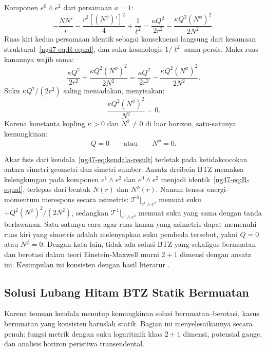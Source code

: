 \noindent Komponen $e^0 \wedge e^2$ dari persamaan $a = 1$:
\begin{equation}\label{ng47-eq:E1}
    -\frac{NN'}{r} - \frac{r^2[(N^\phi)']^2}{4} + \frac{1}{\ell^2}
    = \frac{\kappa Q^2}{2r^2} - \frac{\kappa Q^2(N^\phi)^2}{2N^2}.
\end{equation}
Ruas kiri kedua persamaan identik sebagai konsekuensi langsung dari kesamaan struktural~\eqref{ng47-eq:R-equal}, dan suku kosmologis $1/\ell^2$ sama persis. Maka ruas kanannya wajib sama:
\begin{equation}
    \frac{\kappa Q^2}{2r^2} + \frac{\kappa Q^2(N^\phi)^2}{2N^2}
    = \frac{\kappa Q^2}{2r^2} - \frac{\kappa Q^2(N^\phi)^2}{2N^2}.
\end{equation}
Suku $\kappa Q^2/(2r^2)$ saling meniadakan, menyisakan:
\begin{equation}
    \frac{\kappa Q^2(N^\phi)^2}{N^2} = 0.
\end{equation}
Karena konstanta kopling $\kappa > 0$ dan $N^2 \neq 0$ di luar horizon, satu-satunya kemungkinan:
\begin{equation}\label{ng47-eq:kendala-result}
    Q = 0 \qquad \text{atau} \qquad N^\phi = 0.
\end{equation}

Akar fisis dari kendala~\eqref{ng47-eq:kendala-result} terletak pada ketidakcocokan antara simetri geometri dan simetri sumber. Ansatz dreibein BTZ memaksa kelengkungan pada komponen $e^1 \wedge e^2$ dan $e^0 \wedge e^2$ menjadi identik~\eqref{ng47-eq:R-equal}, terlepas dari bentuk $N(r)$ dan $N^\phi(r)$. Namun tensor energi-momentum merespons secara asimetris: $\mathcal{T}^0|_{e^1 \wedge e^2}$ memuat suku $+Q^2(N^\phi)^2/(2N^2)$, sedangkan $\mathcal{T}^1|_{e^0 \wedge e^2}$ memuat suku yang sama dengan tanda berlawanan. Satu-satunya cara agar ruas kanan yang asimetris dapat memenuhi ruas kiri yang simetris adalah melenyapkan suku pembeda tersebut, yakni $Q = 0$ atau $N^\phi = 0$. Dengan kata lain, tidak ada solusi BTZ yang sekaligus bermuatan dan berotasi dalam teori Einstein-Maxwell murni $2+1$ dimensi dengan ansatz ini. Kesimpulan ini konsisten dengan hasil literatur \cite{clement1996, kubiznak2024}.

\subsection{Solusi Lubang Hitam BTZ Statik Bermuatan}
\label{sec:b4-static}

Karena temuan kendala menutup kemungkinan solusi bermuatan--berotasi, kasus bermuatan yang konsisten haruslah statik. Bagian ini menyelesaikannya secara penuh: fungsi metrik dengan suku logaritmik khas $2+1$ dimensi, potensial gauge, dan analisis horizon peristiwa transendental.

